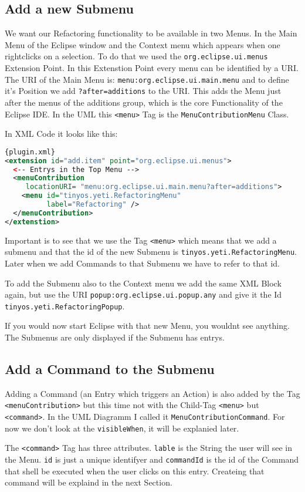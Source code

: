 \documentclass[a4paper,10pt]{report}
\begin{document}
\subsection{Add a new Submenu}
We want our Refactoring functionality to be available in two Menus. In the Main Menu of the Eclipse window and the Context menu which appears when one rightclicks on
a selection. To do that we used the \verb!org.eclipse.ui.menus! Extension Point. In this Extenstion Point every menu can be identified by a URI. The URI of the Main Menu is:
\verb!menu:org.eclipse.ui.main.menu! and to define it's Position we add \verb!?after=additions! to the URI. This adds the Menu just after the menus of the additions group, 
which is the core Functionality of the Eclipse IDE. In the UML this \verb!<menu>! Tag is the \verb!MenuContributionMenu! Class.

In XML Code it looks like this:
\begin{lstlisting}[language=XML,caption=Create Menu Folder ({\it plugin.xml})]{plugin.xml}
<extension id="add.item" point="org.eclipse.ui.menus">
  <-- Entrys in the Top Menu -->
  <menuContribution
     locationURI= "menu:org.eclipse.ui.main.menu?after=additions">
    <menu id="tinyos.yeti.RefactoringMenu"
          label="Refactoring" />
  </menuContribution>
</extenstion>
\end{lstlisting}
Important is to see that we use the Tag \verb!<menu>! which means that we add a submenu and that the id of the new Submenu is \verb!tinyos.yeti.RefactoringMenu!. 
Later when we add Commands to that Submenu we have to refer to that id.

To add the Submenu also to the Context menu we add the same XML Block again, but use the URI \verb!popup:org.eclipse.ui.popup.any! and give it the Id \verb!tinyos.yeti.RefactoringPopup!.

If you would now start Eclipse with that new Menu, you wouldnt see anything. The Submenus are only displayed if the Submenu has entrys.
\subsection{Add a Command to the Submenu}
Adding a Command (an Entry which triggers an Action) is also added by the Tag \verb!<menuContribution>! but this time not with the Child-Tag \verb!<menu>! but \verb!<command>!.
In the UML Diagramm I called it \verb!MenuContributionCommand!. For now we don't look at the \verb!visibleWhen!, it will be explanied later.

The \verb!<command>! Tag has three attributes. \verb!lable! is the String the user will see in the Menu. \verb!id! is just a unique identifyer and \verb!commandId! is the 
id of the Command that shell be executed when the user clicks on this entry. Createing that command will be explaind in the next Section.
\end{document}
